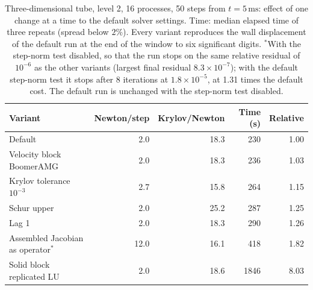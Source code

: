 \begin{table}[htbp]
	\centering
	\caption{Three-dimensional tube, level 2, 16 processes, 50 steps from $t = 5\,\mathrm{ms}$: effect of one change at a time to the default solver settings. Time: median elapsed time of three repeats (spread below $2\%$). Every variant reproduces the wall displacement of the default run at the end of the window to six significant digits. $^{*}$With the step-norm test disabled, so that the run stops on the same relative residual of $10^{-6}$ as the other variants (largest final residual $8.3\times10^{-7}$); with the default step-norm test it stops after 8 iterations at $1.8\times10^{-5}$, at 1.31 times the default cost. The default run is unchanged with the step-norm test disabled.}
	\label{tab:tube3d_pc}
	\begin{tabular}{lrrrr}
		\toprule
		Variant & Newton/step & Krylov/Newton & Time (s) & Relative \\
		\midrule
		Default & 2.0 & 18.3 & 230 & 1.00 \\
		Velocity block BoomerAMG & 2.0 & 18.3 & 236 & 1.03 \\
		Krylov tolerance $10^{-3}$ & 2.7 & 15.8 & 264 & 1.15 \\
		Schur upper & 2.0 & 25.2 & 287 & 1.25 \\
		Lag 1 & 2.0 & 18.3 & 290 & 1.26 \\
		Assembled Jacobian as operator$^{*}$ & 12.0 & 16.1 & 418 & 1.82 \\
		Solid block replicated LU & 2.0 & 18.6 & 1846 & 8.03 \\
		\bottomrule
	\end{tabular}
\end{table}

